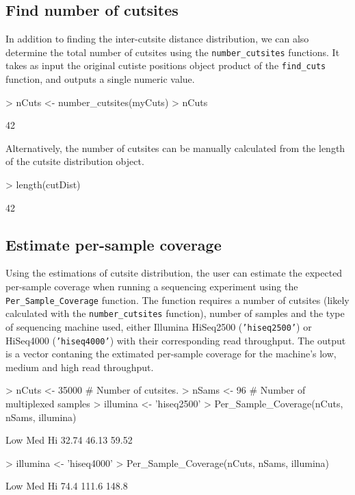 \documentclass{article}
\begin{document}
\subsection{Find number of cutsites}
In addition to finding the inter-cutsite distance distribution, we can also determine the total number of cutsites using the \texttt{number\_cutsites} functions. It takes as input the original cutiste positions object product of the \texttt{find\_cuts} function, and outputs a single numeric value.
\begin{Schunk}
\begin{Sinput}
> nCuts <- number_cutsites(myCuts)
> nCuts
\end{Sinput}
\begin{Soutput}
[1] 42
\end{Soutput}
\end{Schunk}
Alternatively, the number of cutsites can be manually calculated from the length of the cutsite distribution object.
\begin{Schunk}
\begin{Sinput}
> length(cutDist)
\end{Sinput}
\begin{Soutput}
[1] 42
\end{Soutput}
\end{Schunk}

\subsection{Estimate per-sample coverage}
Using the estimations of cutsite distribution, the user can estimate the expected per-sample coverage when running a sequencing experiment using the \texttt{Per\_Sample\_Coverage} function. The function requires a number of cutsites (likely calculated with the \texttt{number\_cutsites} function), number of samples and the type of sequencing machine used, either Illumina HiSeq2500 (\texttt{'hiseq2500'}) or HiSeq4000 (\texttt{'hiseq4000'}) with their corresponding read throughput. The output is a vector contaning the extimated per-sample coverage for the machine's low, medium and high read throughput. 
\begin{Schunk}
\begin{Sinput}
> nCuts <- 35000     # Number of cutsites.
> nSams <- 96        # Number of multiplexed samples 
> illumina <- 'hiseq2500'
> Per_Sample_Coverage(nCuts, nSams, illumina)
\end{Sinput}
\begin{Soutput}
  Low   Med    Hi 
32.74 46.13 59.52 
\end{Soutput}
\begin{Sinput}
> illumina <- 'hiseq4000'
> Per_Sample_Coverage(nCuts, nSams, illumina)
\end{Sinput}
\begin{Soutput}
  Low   Med    Hi 
 74.4 111.6 148.8 
\end{Soutput}
\end{Schunk}
\end{document}
